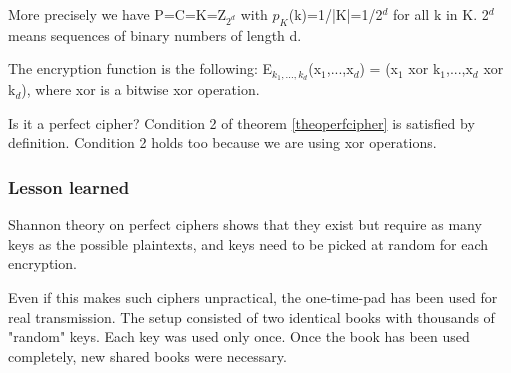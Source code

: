 \documentclass[a4paper, 12pt]{report}
\begin{document}
More precisely we have P=C=K=Z$_{2^d}$ with $p_K$(k)=1/|K|=1/2$^d$ for all k in K. 2$^d$ means sequences of binary numbers of length d.

The encryption function is the following: E$_{k_1,...,k_d}$(x$_1$,...,x$_d$) = (x$_1$ xor k$_1$,...,x$_d$ xor k$_d$), where xor is a bitwise xor operation.

Is it a perfect cipher? Condition 2 of theorem \ref{theoperfcipher} is satisfied by definition. Condition 2 holds too because we are using xor operations.

\subsubsection{Lesson learned}
Shannon theory on perfect ciphers shows that they exist but require as many keys as the possible plaintexts, and keys need to be picked at random for each encryption.

Even if this makes such ciphers unpractical, the one-time-pad has been used for real transmission. The setup consisted of two identical books with thousands of "random" keys. Each key was used only once. Once the book has been used completely, new shared books were necessary.
\end{document}
